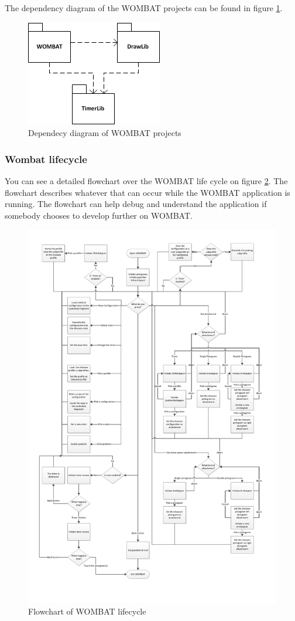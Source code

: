 The dependency diagram of the WOMBAT projects can be found in figure \ref{fig:LibraryDependency}.

\begin{figure}[H]
	\centering
		\includegraphics[scale=0.6]{Images/Implementation/LibraryDependency.png}
	\caption{Dependecy diagram of WOMBAT projects}
	\label{fig:LibraryDependency}
\end{figure}

\subsubsection{Wombat lifecycle}
You can see a detailed flowchart over the WOMBAT life cycle on figure \ref{fig:wombatLifeCycle}. The flowchart describes whatever that can occur while the WOMBAT application is running. The flowchart can help debug and understand the application if somebody chooses to develop further on WOMBAT.

\begin{figure}[H]
	\centering
		\includegraphics[scale=0.6]{Images/Implementation/wombatLifeCycle.pdf}
	\caption{Flowchart of WOMBAT lifecycle}
	\label{fig:wombatLifeCycle}
\end{figure}